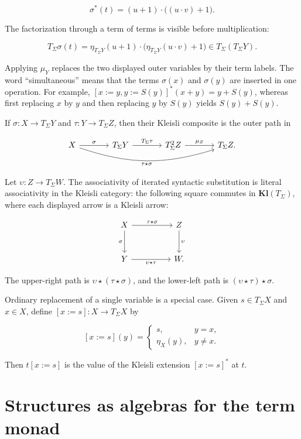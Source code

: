 \documentclass[11pt]{article}
\begin{document}
\[
\sigma^*(t)=(u+1)\cdot\bigl((u\cdot v)+1\bigr).
\]

The factorization through a term of terms is visible before multiplication:

\[
T_\Sigma\sigma(t)
=\eta_{T_\Sigma Y}(u+1)\cdot
 \bigl(\eta_{T_\Sigma Y}(u\cdot v)+1\bigr)
\in T_\Sigma(T_\Sigma Y).
\]

Applying \(\mu_Y\) replaces the two displayed outer variables by their term
labels. The word ``simultaneous'' means that the terms \(\sigma(x)\) and
\(\sigma(y)\) are inserted in one operation. For example,
\([x:=y,y:=S(y)]^*(x+y)=y+S(y)\), whereas first replacing \(x\) by \(y\)
and then replacing \(y\) by \(S(y)\) yields \(S(y)+S(y)\).

If \(\sigma:X\to T_\Sigma Y\) and \(\tau:Y\to T_\Sigma Z\), then their
Kleisli composite is the outer path in

\[
\begin{tikzcd}[column sep=large]
X \arrow[r,"\sigma"]
  \arrow[rrr,bend right=18,"\tau\star\sigma"'] &
T_\Sigma Y \arrow[r,"T_\Sigma\tau"] &
T_\Sigma^2Z \arrow[r,"\mu_Z"] &
T_\Sigma Z.
\end{tikzcd}
\]

Let \(\upsilon:Z\to T_\Sigma W\). The associativity of iterated syntactic
substitution is literal associativity in the Kleisli category: the following
square commutes in \(\mathbf{Kl}(T_\Sigma)\), where each displayed arrow is a
Kleisli arrow:

\[
\begin{tikzcd}[row sep=large,column sep=huge]
X \arrow[r,"\tau\star\sigma"] \arrow[d,"\sigma"'] &
Z \arrow[d,"\upsilon"] \\
Y \arrow[r,"\upsilon\star\tau"'] & W.
\end{tikzcd}
\]

The upper-right path is \(\upsilon\star(\tau\star\sigma)\), and the
lower-left path is \((\upsilon\star\tau)\star\sigma\).

Ordinary replacement of a single variable is a special case. Given
\(s\in T_\Sigma X\) and \(x\in X\), define
\([x:=s]:X\to T_\Sigma X\) by

\[
[x:=s](y)=
\begin{cases}
s,&y=x,\\
\eta_X(y),&y\ne x.
\end{cases}
\]

Then \(t[x:=s]\) is the value of the Kleisli extension \([x:=s]^*\) at
\(t\).

\section{Structures as algebras for the term
monad}\label{structures-as-algebras-for-the-term-monad}
\end{document}
